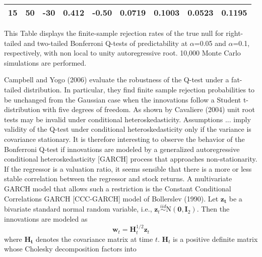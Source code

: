\documentclass{article}
\begin{document}
\begin{table}[h!]
\begin{threeparttable}
\begin{tabular}{rrrrrrrrr}
  15 & 50 & -30 & 0.412 & -0.50 & 0.0719 & 0.1003 & 0.0523 & 0.1195 \\ 
   \hline
\end{tabular}
 \begin{tablenotes}
 \small
\item This Table displays the finite-sample rejection rates of the true null for right-tailed and two-tailed Bonferroni Q-tests of predictability at $\alpha$=0.05 and $\alpha$=0.1, respectively, with non local to unity autoregressive root. 10,000 Monte Carlo simulations are performed.
\end{tablenotes}
\end{threeparttable}
\end{table}

Campbell and Yogo (2006) evaluate the robustness of the Q-test under a fat-tailed distribution. In particular, they find finite sample rejection probabilities to be unchanged from the Gaussian case when the innovations follow a Student t-distribution with five degrees of freedom. As shown by Cavaliere (2004) unit root tests may be invalid under conditional heteroskedasticity. Assumptions ... imply validity of the Q-test under conditional heteroskedasticity only if the variance is covariance stationary. 
It is therefore interesting to observe the behavior of the Bonferroni Q-test if innovations are modeled by a generalized autoregressive conditional heteroskedasticity [GARCH] process that approaches non-stationarity. If the regressor is a valuation ratio, it seems sensible that there is a more or less stable correlation between the regressor and stock returns. A multivariate GARCH model that allows such a restriction is the Constant Conditional Correlations GARCH  [CCC-GARCH] model of Bollerslev (1990). Let $ \boldsymbol{z_{t}}$ be a bivariate standard normal random variable, i.e., $ \boldsymbol{z}_{t} \stackrel{i i d}{\sim} \mathrm{N}\left(\mathbf{0}, \boldsymbol{I}_{2}\right)$. Then the innovations are modeled as 
\begin{equation}
 \boldsymbol{w}_{t}=\boldsymbol{H}_{t}^{1 / 2} \boldsymbol{z}_{t}
\end{equation}
where $ \boldsymbol{H_t}$ denotes the covariance matrix at time $t$. $\boldsymbol{H}_{t}$ is a positive definite matrix whose Cholesky decomposition factors into 
\end{document}

